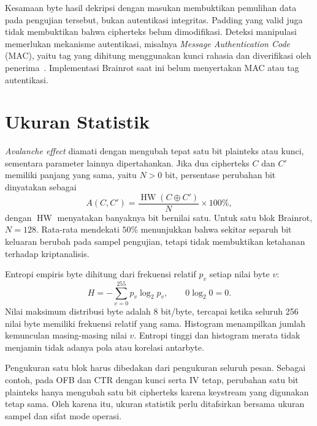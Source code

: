 Kesamaan byte hasil dekripsi dengan masukan membuktikan pemulihan data
pada pengujian tersebut, bukan autentikasi integritas. Padding yang valid
juga tidak membuktikan bahwa cipherteks belum dimodifikasi. Deteksi
manipulasi memerlukan mekanisme autentikasi, misalnya
\textit{Message Authentication Code} (MAC), yaitu tag yang dihitung
menggunakan kunci rahasia dan diverifikasi oleh penerima~\cite[bagian 9]{padding}.
Implementasi Brainrot saat ini belum menyertakan MAC atau tag autentikasi.

\section{Ukuran Statistik}
\textit{Avalanche effect} diamati dengan mengubah tepat satu bit plainteks
atau kunci, sementara parameter lainnya dipertahankan. Jika dua
cipherteks $C$ dan $C'$ memiliki panjang yang sama, yaitu $N>0$ bit,
persentase perubahan bit dinyatakan sebagai
\begin{equation}
  A(C,C')=\frac{\operatorname{HW}(C\oplus C')}{N}\times100\%,
\end{equation}
dengan $\operatorname{HW}$ menyatakan banyaknya bit bernilai satu.
Untuk satu blok Brainrot, $N=128$. Rata-rata mendekati $50\%$ menunjukkan
bahwa sekitar separuh bit keluaran berubah pada sampel pengujian,
tetapi tidak membuktikan ketahanan terhadap kriptanalisis.

Entropi empiris byte dihitung dari
frekuensi relatif $p_v$ setiap nilai byte $v$:
\begin{equation}
  H=-\sum_{v=0}^{255}p_v\log_2 p_v,\qquad 0\log_2 0=0.
\end{equation}
Nilai maksimum distribusi byte adalah 8 bit/byte, tercapai ketika seluruh
256 nilai byte memiliki frekuensi relatif yang sama. Histogram menampilkan
jumlah kemunculan masing-masing nilai $v$. Entropi tinggi dan histogram
merata tidak menjamin tidak adanya pola atau korelasi antarbyte.

Pengukuran satu blok harus dibedakan dari pengukuran seluruh pesan.
Sebagai contoh, pada OFB dan CTR dengan kunci serta IV tetap, perubahan
satu bit plainteks hanya mengubah satu bit cipherteks karena keystream
yang digunakan tetap sama. Oleh karena itu, ukuran statistik perlu
ditafsirkan bersama ukuran sampel dan sifat mode operasi.

